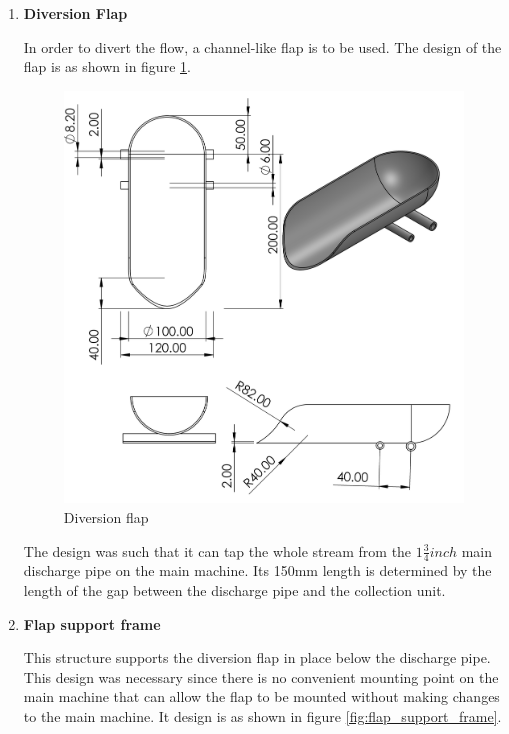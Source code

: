\begin{enumerate}
    \item \textbf{Diversion Flap}
    \par
    In order to divert the flow, a channel-like flap is to be used. The design of the flap is as shown in figure \ref{fig:diversion_flap}. 
    \begin{figure}[H]
        \centering
        \includegraphics{Figures/flap2.PNG}
        \caption{Diversion flap}
        \label{fig:diversion_flap}
    \end{figure}
    The design was such that it can tap the whole stream from the $1\frac{3}{4} inch$ main discharge pipe on the main machine. Its 150mm length is determined by the length of the gap between the discharge pipe and the collection unit.
    \item \textbf{Flap support frame}
    \par
    This structure supports the diversion flap in place below the discharge pipe. This design was necessary since there is no convenient mounting point on the main machine that can allow the flap to be mounted without making changes to the main machine. It design is as shown in figure \ref{fig:flap_support_frame}.
    \begin{figure}[H]
        \centering

\end{figure}
\end{enumerate}
